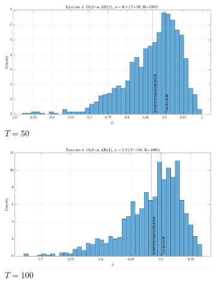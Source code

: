 \documentclass[dvipsnames,11pt]{article}
\begin{document}
\begin{solution}
                \begin{figure}[h]
                     \centering
                     \begin{subfigure}[b]{0.49\textwidth}
                         \centering
                         \includegraphics[width=\textwidth, trim=0cm 0cm 0cm 0.55cm, clip]{output/ex4_hist_T50.png}
                         \caption{\(T=50\)}
                         \label{fig:ex4_hist_T50}                         
                     \end{subfigure}
                     \hfill
                     \begin{subfigure}[b]{0.49\textwidth}
                         \centering
                         \includegraphics[width=\textwidth, trim=0cm 0cm 0cm 0.55cm, clip]{output/ex4_hist_T100.png}
                         \caption{\(T=100\)}
                         \label{fig:ex4_hist_T100}
                     \end{subfigure}
                     \hfill
                     \begin{subfigure}[b]{0.49\textwidth}

\end{subfigure}
\end{figure}
\end{solution}
\end{document}
